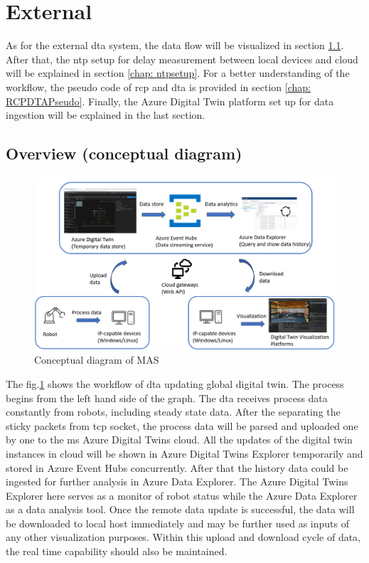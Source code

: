 \section{External} \label{chap: Meth-External}
As for the external \gls{dta} system, the data flow will be visualized in section \ref{chap: Overview-External}.
After that, the \gls{ntp} setup for delay measurement between local devices and cloud will
be explained in section \ref{chap: ntpsetup}. For a better understanding of the workflow, 
the pseudo code of \gls{rcp} and \gls{dta} is provided in section \ref{chap: RCPDTAPseudo}. 
Finally, the Azure Digital Twin platform set up for data ingestion will be explained
in the last section.



\subsection{Overview (conceptual diagram)}\label{chap: Overview-External}

\begin{figure}[htb]
\includegraphics[width=\textwidth]{figures/DT_Conceptual_Diagram.png}

\centering
\caption{Conceptual diagram of MAS\label{fig: DTConceptual}}
\end{figure}

The fig.\ref{fig: DTConceptual} shows the workflow of \gls{dta} updating global digital twin.
The process begins from the left hand side of the graph. The \gls{dta} receives process data constantly from robots, including steady state data. 
After the separating the sticky packets from \gls{tcp} socket, the process data will be parsed and uploaded one by one to the \gls{ms} Azure Digital Twins cloud. 
All the updates of the digital twin instances in cloud will be shown in Azure Digital Twins Explorer temporarily and stored in Azure Event Hubs concurrently. 
After that the history data could be ingested for further analysis in Azure Data Explorer. 
The Azure Digital Twins Explorer here serves as a monitor of robot status while the Azure Data Explorer as a data analysis tool. 
Once the remote data update is successful, the data will be downloaded to local host immediately and may be further used as inputs of any other visualization purposes. 
Within this upload and download cycle of data, the real time capability should also be maintained.  


